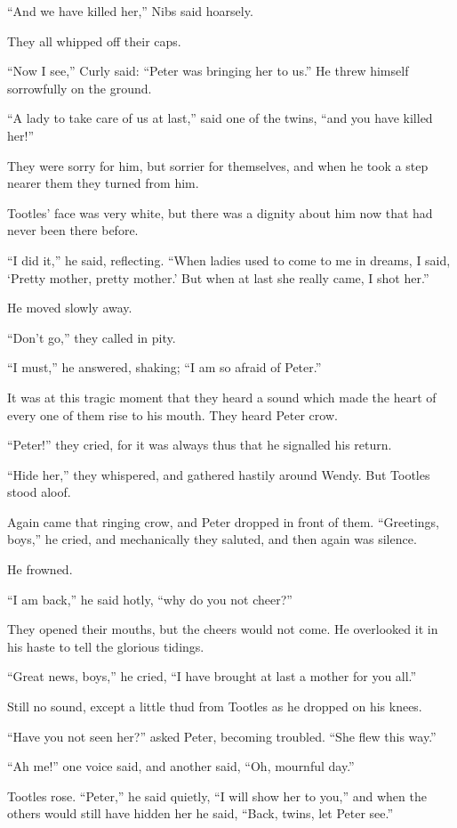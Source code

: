 ``And we have killed her,'' Nibs said hoarsely.

They all whipped off their caps.

``Now I see,'' Curly said: ``Peter was bringing her to us.'' He threw
himself sorrowfully on the ground.

``A lady to take care of us at last,'' said one of the twins, ``and you
have killed her!''

They were sorry for him, but sorrier for themselves, and when he took a
step nearer them they turned from him.

Tootles' face was very white, but there was a dignity about him now
that had never been there before.

``I did it,'' he said, reflecting. ``When ladies used to come to me in
dreams, I said, ‘Pretty mother, pretty mother.' But when at last she
really came, I shot her.''

He moved slowly away.

``Don't go,'' they called in pity.

``I must,'' he answered, shaking; ``I am so afraid of Peter.''

It was at this tragic moment that they heard a sound which made the
heart of every one of them rise to his mouth. They heard Peter crow.

``Peter!'' they cried, for it was always thus that he signalled his
return.

``Hide her,'' they whispered, and gathered hastily around Wendy. But
Tootles stood aloof.

Again came that ringing crow, and Peter dropped in front of them.
``Greetings, boys,'' he cried, and mechanically they saluted, and then
again was silence.

He frowned.

``I am back,'' he said hotly, ``why do you not cheer?''

They opened their mouths, but the cheers would not come. He overlooked
it in his haste to tell the glorious tidings.

``Great news, boys,'' he cried, ``I have brought at last a mother for you
all.''

Still no sound, except a little thud from Tootles as he dropped on his
knees.

``Have you not seen her?'' asked Peter, becoming troubled. ``She flew this
way.''

``Ah me!'' one voice said, and another said, ``Oh, mournful day.''

Tootles rose. ``Peter,'' he said quietly, ``I will show her to you,'' and
when the others would still have hidden her he said, ``Back, twins, let
Peter see.''

